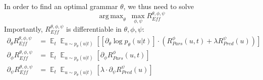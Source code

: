 \documentclass[10pt,twoside,lineno]{article}
\DeclareMathOperator*{\argmax}{arg\,max}
\DeclareMathOperator{\E}{\mathop{\mathbb{E}}}
\begin{document}
%
%
In order to find an optimal grammar $\theta$, we thus need to solve
\begin{equation}\label{eq:efficiency}
\argmax_\theta\	\max_{\phi, \psi} R_{\textit{Eff}}^{\theta, \phi, \psi} %
\end{equation}
Importantly, $R_{\textit{Eff}}^{\theta, \phi, \psi}$ is differentiable in $\theta, \phi, \psi$: %
\begin{align}
\partial_\theta R_{\textit{Eff}}^{\theta, \phi, \psi} &= \E_t \E_{u \sim p_\theta(u|t)} \left[  \left[\partial_\theta \log p_\theta(u|t)\right] \cdot    \left(R_{Pars}^{\phi}(u,t) + \lambda R_{Pred}^{\psi}(u)\right) \right] \label{eq:dtheta}\\ 
\partial_\phi R_{\textit{Eff}}^{\theta, \phi, \psi} &= \E_t \E_{u \sim p_\theta(u|t)}  \left[\partial_\phi R_{Pars}^{\phi}(u,t)\right] \\
\partial_\psi R_{\textit{Eff}}^{\theta, \phi, \psi} &= \E_t \E_{u \sim p_\theta(u|t)}  \left[\lambda \cdot \partial_\psi R_{Pred}^{\psi}(u)\right] \label{eq:dpsi}
\end{align}
\end{document}
